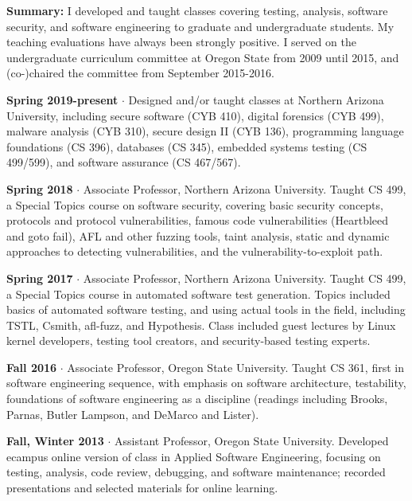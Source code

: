 \documentclass[ComputerScience]{vita}
\begin{document}
\begin{vita}
\begin{Teaching}
\item {\bf Summary:} I developed and taught classes covering testing,
  analysis, software security, and software engineering to graduate
  and undergraduate students.  My teaching evaluations have always been strongly positive.  I served on the undergraduate curriculum committee at Oregon State from 2009 until 2015, and (co-)chaired the committee from September 2015-2016.

\item{\bf Spring 2019-present} $\cdot$ Designed and/or taught classes at
  Northern Arizona University, including secure software (CYB 410), digital forensics (CYB 499), malware
  analysis (CYB 310), secure design II (CYB 136),
  programming language foundations (CS 396), databases (CS 345),
  embedded systems testing (CS 499/599), and
  software assurance (CS 467/567).
  
\item{\bf Spring 2018} $\cdot$ Associate Professor, Northern Arizona
  University.  Taught CS 499, a Special Topics course on software
  security, covering basic security concepts, protocols and protocol
  vulnerabilities, famous code vulnerabilities (Heartbleed and goto fail), AFL and other
  fuzzing tools, taint analysis, static and dynamic approaches to
  detecting vulnerabilities, and the vulnerability-to-exploit path. 

\item{\bf Spring 2017} $\cdot$ Associate Professor, Northern Arizona University.  Taught CS 499, a Special Topics course in automated software test generation.  Topics included basics of automated software testing, and using actual tools in the field, including TSTL, Csmith, afl-fuzz, and Hypothesis.  Class included guest lectures by Linux kernel developers, testing tool creators, and security-based testing experts.

\item{\bf Fall 2016} $\cdot$ Associate Professor, Oregon State University.  Taught CS 361, first in software engineering sequence, with emphasis on software architecture, testability, foundations of software engineering as a discipline (readings including Brooks, Parnas, Butler Lampson, and DeMarco and Lister).

\item{\bf Fall, Winter 2013} $\cdot$ Assistant Professor, Oregon State University.  Developed ecampus online version of class in Applied Software Engineering, focusing on testing, analysis, code review, debugging, and software maintenance; recorded presentations and selected materials for online learning.


\end{Teaching}
\end{vita}
\end{document}
